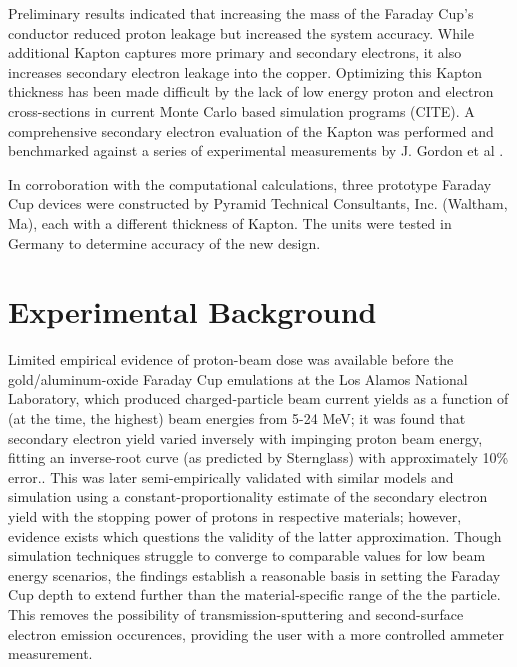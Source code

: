 \documentclass{mc2015}
\begin{document}
Preliminary results indicated that increasing the mass of the Faraday Cup’s conductor reduced proton leakage but increased the system accuracy. While additional Kapton captures more primary and secondary electrons, it also increases secondary electron leakage into the copper. Optimizing this Kapton thickness has been made difficult by the lack of low energy proton and electron cross-sections in current Monte Carlo based simulation programs (CITE). A comprehensive secondary electron evaluation of the Kapton was performed and benchmarked against a series of experimental measurements by J. Gordon et al \cite{PTC-HIT}.

In corroboration with the computational calculations, three prototype Faraday Cup devices were constructed by Pyramid Technical Consultants, Inc. (Waltham, Ma), each with a different thickness of Kapton. The units were tested in Germany to determine accuracy of the new design.


\section{Experimental Background}

Limited empirical evidence of proton-beam dose was available before the gold/aluminum-oxide Faraday Cup emulations at the Los Alamos National Laboratory, which produced charged-particle beam current yields as a function of (at the time, the highest) beam energies from 5-24 MeV; it was found that secondary electron yield varied inversely with impinging proton beam energy, fitting an inverse-root curve (as predicted by Sternglass) with approximately 10\% error.\cite{bo88,st57}.  This was later semi-empirically validated with similar models\cite{Castaneda} and simulation using a constant-proportionality estimate of the secondary electron yield with the stopping power of protons in respective materials\cite{Kramer}; however, evidence exists which questions the validity of the latter approximation\cite{du02}.  Though simulation techniques struggle to converge to comparable values for low beam energy scenarios, the findings establish a reasonable basis in setting the Faraday Cup depth to extend further than the material-specific range of the the particle.  This removes the possibility of transmission-sputtering and second-surface electron emission occurences, providing the user with a more controlled ammeter measurement\cite{bo88}.
\end{document}
